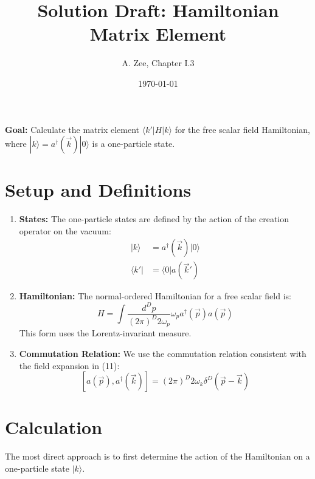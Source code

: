 \documentclass[11pt, a4paper]{article}
\title{Solution Draft: Hamiltonian Matrix Element}
\author{A. Zee, Chapter I.3}
\date{\today}
\begin{document}
\maketitle
\thispagestyle{empty}

\textbf{Goal:} Calculate the matrix element $\langle k'|H|k\rangle$ for the free scalar field Hamiltonian, where $|k\rangle = a^\dagger(\vec{k})|0\rangle$ is a one-particle state.

\section*{Setup and Definitions}

\begin{enumerate}
    \item \textbf{States:} The one-particle states are defined by the action of the creation operator on the vacuum:
    \begin{align*}
        |k\rangle &= a^\dagger(\vec{k})|0\rangle \\
        \langle k'| &= \langle 0|a(\vec{k}')
    \end{align*}

    \item \textbf{Hamiltonian:} The normal-ordered Hamiltonian for a free scalar field is:
    \[ H = \int \frac{d^Dp}{(2\pi)^D 2\omega_p} \omega_p a^\dagger(\vec{p})a(\vec{p}) \]
    This form uses the Lorentz-invariant measure.

    \item \textbf{Commutation Relation:} We use the commutation relation consistent with the field expansion in (11):
    \[ [a(\vec{p}), a^\dagger(\vec{k})] = (2\pi)^D 2\omega_k \delta^D(\vec{p}-\vec{k}) \]
\end{enumerate}

\section*{Calculation}

The most direct approach is to first determine the action of the Hamiltonian on a one-particle state $|k\rangle$.
\end{document}
